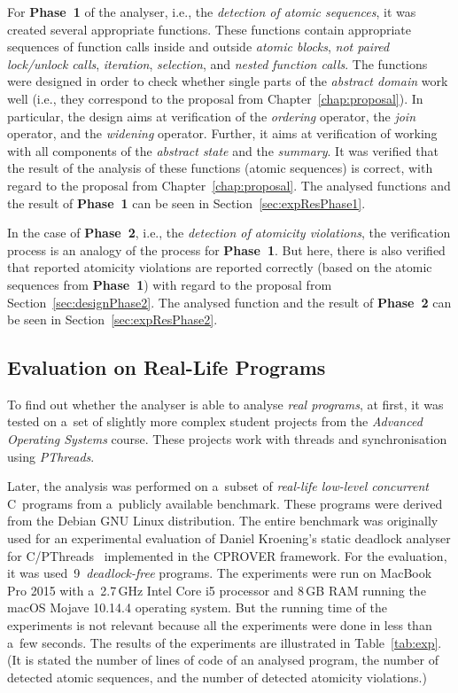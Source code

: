 For \textbf{Phase~1} of the analyser, i.e., the \emph{detection of
atomic sequences}, it was created several appropriate functions. These
functions contain appropriate sequences of function calls inside
and outside \emph{atomic blocks}, \emph{not paired lock/unlock calls},
\emph{iteration}, \emph{selection}, and \emph{nested function calls}.
The functions were designed in order to check whether single parts of
the \emph{abstract domain} work well (i.e., they correspond to the proposal
from Chapter~\ref{chap:proposal}). In particular, the design aims at
verification of the \emph{ordering} operator, the \emph{join} operator,
and the \emph{widening} operator. Further, it aims at verification of
working with all components of the \emph{abstract state} and the
\emph{summary}. It was verified that the result of the analysis
of these functions (atomic sequences) is correct, with regard to
the proposal from Chapter~\ref{chap:proposal}. The analysed functions
and the result of \textbf{Phase~1} can be seen in
Section~\ref{sec:expResPhase1}.

In the case of \textbf{Phase~2}, i.e., the \emph{detection of atomicity
violations}, the verification process is an analogy of the process
for \textbf{Phase~1}. But here, there is also verified that reported
atomicity violations are reported correctly (based on the atomic sequences
from \textbf{Phase~1}) with regard to the proposal from
Section~\ref{sec:designPhase2}. The analysed function and the result
of \textbf{Phase~2} can be seen in Section~\ref{sec:expResPhase2}.


\subsection{Evaluation on Real-Life Programs}
\label{sec:expReal}

To find out whether the analyser is able to analyse \emph{real programs},
at first, it was tested on a~set of slightly more complex student
projects from the \emph{Advanced Operating Systems} course. These projects
work with threads and synchronisation using \emph{PThreads}.

Later, the analysis was performed on a~subset of \emph{real-life low-level
concurrent} C~programs from a~publicly available benchmark.
These programs were derived from the Debian GNU Linux distribution. The
entire benchmark was originally used for an experimental evaluation of
Daniel Kroening's static deadlock analyser for
C/PThreads~\cite{deadlockKroening} implemented in the CPROVER framework. For
the evaluation, it was used~9~\emph{deadlock-free} programs. The experiments
were run on MacBook Pro 2015 with a~2.7\,GHz Intel Core i5 processor
and 8\,GB RAM running the macOS Mojave 10.14.4 operating system.
But the running time of the experiments is not relevant because all
the experiments were done in less than a~few seconds. The results of the
experiments are illustrated in Table~\ref{tab:exp}. (It is stated the number
of lines of code of an analysed program, the number of detected atomic
sequences, and the number of detected atomicity violations.)

